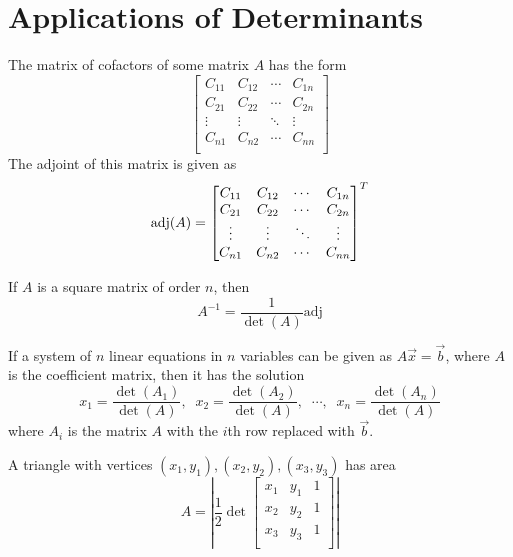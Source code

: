 \section{Applications of Determinants}
\begin{definition}
    The matrix of cofactors of some matrix \(A\) has the form
    \[
        \begin{bmatrix}
            C_{11}  &C_{12}   &\cdots  &C_{1n}    \\
             C_{21} &C_{22}   &\cdots  &C_{2n}    \\
             \vdots&\vdots  &\ddots  &\vdots   \\
             C_{n1} &C_{n2}   &\cdots  &C_{nn}    \\
        \end{bmatrix}
    \]
    The adjoint of this matrix is given as 
    \[
        \text{adj}(A)=\begin{bmatrix}
            C_{11}  &C_{12}   &\cdots  &C_{1n}    \\
             C_{21} &C_{22}   &\cdots  &C_{2n}    \\
             \vdots&\vdots  &\ddots  &\vdots   \\
             C_{n1} &C_{n2}   &\cdots  &C_{nn}    \\
        \end{bmatrix}^{\large T}
    \]
\end{definition}
\begin{theorem}
    If \(A\) is a square matrix of order \(n\), then 
    \[
        A^{-1} =\frac{1}{\det (A)}\text{adj} 
    \]
\end{theorem}
\begin{theorem}
    If a system of \(n\) linear equations in \(n\) variables can be given as \(A\vec{x}=\vec{b}\), where \(A\) is the coefficient matrix, then it has the solution 
    \[
        x_1 =\frac{\det (A_1)}{\det (A)},\;\; x_2=\frac{\det (A_2)}{\det (A)},\;\;\cdots,\;\;x_n =\frac{\det (A_n)}{\det (A)}
    \]
    where \(A_i\) is the matrix \(A\) with the \(i\)th row replaced with \(\vec{b}\).
\end{theorem}
\begin{theorem}
    A triangle with vertices \((x_1,y_1),(x_2,y_2),(x_3,y_3)\) has area 
    \[
        A=\left\vert \frac{1}{2} \det \begin{bmatrix}
            x_1 &y_1  &1   \\
             x_2&y_2  &1   \\
             x_3&y_3  &1   \\
        \end{bmatrix} \right\vert 
    \]
\end{theorem}
